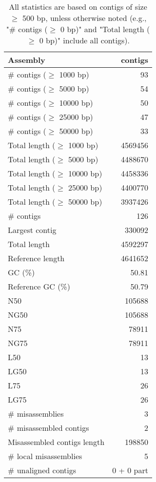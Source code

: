 \documentclass[12pt,a4paper]{article}
\begin{document}
\begin{table}[ht]
\begin{center}
\caption{All statistics are based on contigs of size $\geq$ 500 bp, unless otherwise noted (e.g., "\# contigs ($\geq$ 0 bp)" and "Total length ($\geq$ 0 bp)" include all contigs).}
\begin{tabular}{|l*{1}{|r}|}
\hline
Assembly & contigs \\ \hline
\# contigs ($\geq$ 1000 bp) & 93 \\ \hline
\# contigs ($\geq$ 5000 bp) & 54 \\ \hline
\# contigs ($\geq$ 10000 bp) & 50 \\ \hline
\# contigs ($\geq$ 25000 bp) & 47 \\ \hline
\# contigs ($\geq$ 50000 bp) & 33 \\ \hline
Total length ($\geq$ 1000 bp) & 4569456 \\ \hline
Total length ($\geq$ 5000 bp) & 4488670 \\ \hline
Total length ($\geq$ 10000 bp) & 4458336 \\ \hline
Total length ($\geq$ 25000 bp) & 4400770 \\ \hline
Total length ($\geq$ 50000 bp) & 3937426 \\ \hline
\# contigs & 126 \\ \hline
Largest contig & 330092 \\ \hline
Total length & 4592297 \\ \hline
Reference length & 4641652 \\ \hline
GC (\%) & 50.81 \\ \hline
Reference GC (\%) & 50.79 \\ \hline
N50 & 105688 \\ \hline
NG50 & 105688 \\ \hline
N75 & 78911 \\ \hline
NG75 & 78911 \\ \hline
L50 & 13 \\ \hline
LG50 & 13 \\ \hline
L75 & 26 \\ \hline
LG75 & 26 \\ \hline
\# misassemblies & 3 \\ \hline
\# misassembled contigs & 2 \\ \hline
Misassembled contigs length & 198850 \\ \hline
\# local misassemblies & 5 \\ \hline
\# unaligned contigs & 0 + 0 part \\ \hline

\end{tabular}
\end{center}
\end{table}
\end{document}
